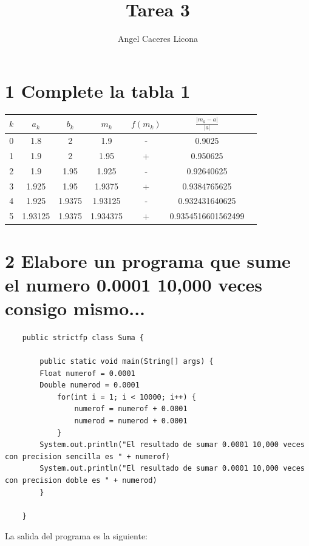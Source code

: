 \documentclass{article}
\begin{document}
\title{Tarea 3}
\author{Angel Caceres Licona}

\maketitle


\section{1 Complete la tabla 1}

\begin{center}
    \begin{tabular}{||c c c c c c c||} 
    \hline
    $k$ & $a_k$ & $b_k$ & $m_k$ & $f(m_k)$ & $\frac{|m_k - a|}{|a|}$ \\ [0.5ex] 
    \hline\hline
    0 & 1.8 & 2 & 1.9 & - & 0.9025 \\ 
    \hline
    1 & 1.9 & 2 & 1.95 & + & 0.950625 \\
    \hline
    2 & 1.9 & 1.95 & 1.925 & - & 0.92640625\\
    \hline
    3 & 1.925 & 1.95 & 1.9375 & + & 0.9384765625\\
    \hline
    4 & 1.925 & 1.9375 & 1.93125 & - & 0.932431640625\\
    \hline 
    5 & 1.93125 & 1.9375 & 1.934375 & + & 0.9354516601562499\\ [1ex]
    \hline
   \end{tabular}
   \end{center}



\section{2 Elabore un programa que sume el numero 0.0001 10,000 veces consigo mismo...}

\begin{lstlisting}
    public strictfp class Suma {

        public static void main(String[] args) {
        Float numerof = 0.0001
        Double numerod = 0.0001
            for(int i = 1; i < 10000; i++) {
                numerof = numerof + 0.0001
                numerod = numerod + 0.0001
            }
        System.out.println("El resultado de sumar 0.0001 10,000 veces con precision sencilla es " + numerof)
        System.out.println("El resultado de sumar 0.0001 10,000 veces con precision doble es " + numerod)
        }    
            
    }
\end{lstlisting}
La salida del programa es la siguiente: 
\end{document}
